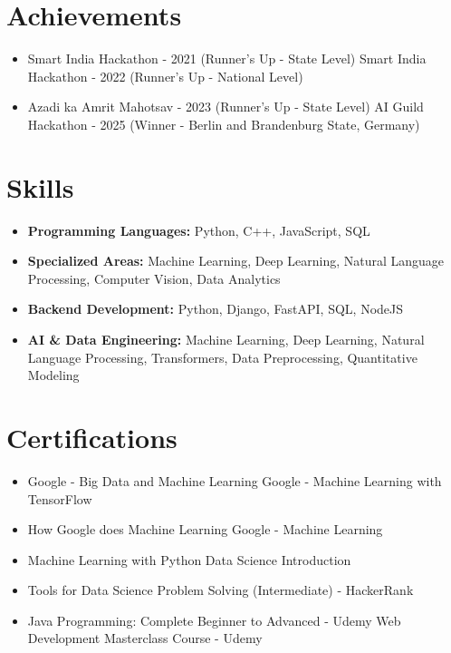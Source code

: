 \documentclass[a4paper,10pt]{article}
\begin{document}
\section*{Achievements}
\begin{itemize}
\item Smart India Hackathon - 2021 (Runner's Up - State Level) \hfill Smart India Hackathon - 2022 (Runner's Up - National Level)
\item Azadi ka Amrit Mahotsav - 2023 (Runner's Up - State Level) \hfill AI Guild Hackathon - 2025 (Winner - Berlin and Brandenburg State, Germany)
\end{itemize}

\section*{Skills}
\begin{itemize}
  \item \textbf{Programming Languages:} Python, C++, JavaScript, SQL
  \item \textbf{Specialized Areas:} Machine Learning, Deep Learning, Natural Language Processing, Computer Vision, Data Analytics
  \item \textbf{Backend Development:} Python, Django, FastAPI, SQL, NodeJS
  \item \textbf{AI \& Data Engineering:} Machine Learning, Deep Learning, Natural Language Processing, Transformers, Data Preprocessing, Quantitative Modeling
\end{itemize}

\section*{Certifications}
\begin{itemize}
\item Google - Big Data and Machine Learning \hfill Google - Machine Learning with TensorFlow
\item How Google does Machine Learning \hfill Google - Machine Learning
\item Machine Learning with Python \hfill Data Science Introduction
\item Tools for Data Science \hfill Problem Solving (Intermediate) - HackerRank
\item Java Programming: Complete Beginner to Advanced - Udemy \hfill Web Development Masterclass Course - Udemy
\end{itemize}
\end{document}
